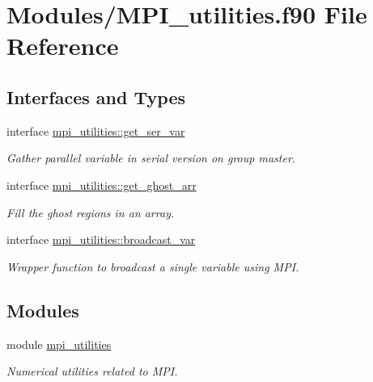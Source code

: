 \hypertarget{MPI__utilities_8f90}{}\section{Modules/\+M\+P\+I\+\_\+utilities.f90 File Reference}
\label{MPI__utilities_8f90}
\subsection*{Interfaces and Types}
\begin{DoxyCompactItemize}
\item 
interface \hyperlink{interfacempi__utilities_1_1get__ser__var}{mpi\+\_\+utilities\+::get\+\_\+ser\+\_\+var}
\begin{DoxyCompactList}\small\item\em Gather parallel variable in serial version on group master. \end{DoxyCompactList}\item 
interface \hyperlink{interfacempi__utilities_1_1get__ghost__arr}{mpi\+\_\+utilities\+::get\+\_\+ghost\+\_\+arr}
\begin{DoxyCompactList}\small\item\em Fill the ghost regions in an array. \end{DoxyCompactList}\item 
interface \hyperlink{interfacempi__utilities_1_1broadcast__var}{mpi\+\_\+utilities\+::broadcast\+\_\+var}
\begin{DoxyCompactList}\small\item\em Wrapper function to broadcast a single variable using M\+PI. \end{DoxyCompactList}\end{DoxyCompactItemize}
\subsection*{Modules}
\begin{DoxyCompactItemize}
\item 
module \hyperlink{namespacempi__utilities}{mpi\+\_\+utilities}
\begin{DoxyCompactList}\small\item\em Numerical utilities related to M\+PI. \end{DoxyCompactList}\end{DoxyCompactItemize}
